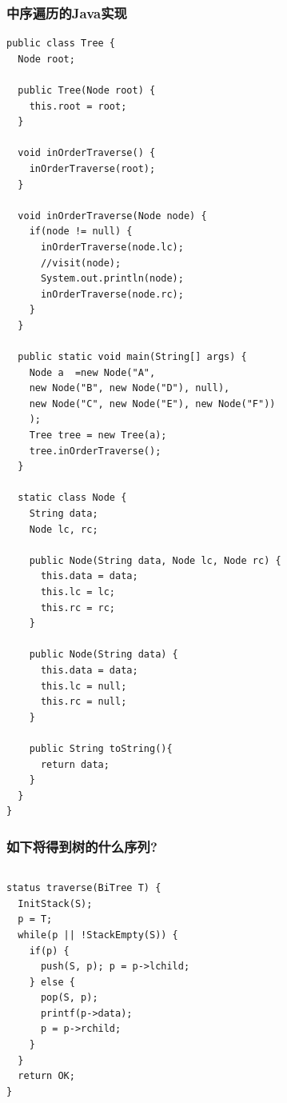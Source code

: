 \begin{frame}
  \frametitle{中序遍历的Java实现}
  \begin{verbatim}
public class Tree {
  Node root;

  public Tree(Node root) {
    this.root = root;
  }

  void inOrderTraverse() {
    inOrderTraverse(root);
  }

  void inOrderTraverse(Node node) {
    if(node != null) {
      inOrderTraverse(node.lc);
      //visit(node);
      System.out.println(node);
      inOrderTraverse(node.rc);
    }
  }

  public static void main(String[] args) {
    Node a  =new Node("A",
    new Node("B", new Node("D"), null),
    new Node("C", new Node("E"), new Node("F"))
    );
    Tree tree = new Tree(a);
    tree.inOrderTraverse();
  }

  static class Node {
    String data;
    Node lc, rc;

    public Node(String data, Node lc, Node rc) {
      this.data = data;
      this.lc = lc;
      this.rc = rc;
    }

    public Node(String data) {
      this.data = data;
      this.lc = null;
      this.rc = null;
    }

    public String toString(){
      return data;
    }
  }
}
  \end{verbatim}
\end{frame}

\begin{frame}[fragile]
  \frametitle{如下将得到树的什么序列?}
  \begin{columns}[T]
    \begin{verbatim}
status traverse(BiTree T) {
  InitStack(S);
  p = T;
  while(p || !StackEmpty(S)) {
    if(p) {
      push(S, p); p = p->lchild;
    } else {
      pop(S, p);
      printf(p->data);
      p = p->rchild;
    }
  }
  return OK;
}
    \end{verbatim}

  \end{columns}  
\end{frame}


